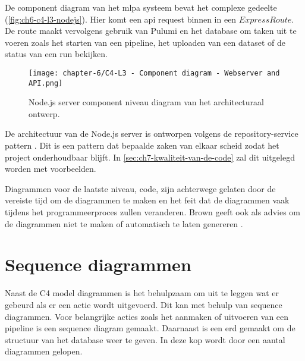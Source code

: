 De component diagram van het \acrshort{mlpa} systeem bevat het complexe gedeelte (\autoref{fig:ch6-c4-l3-nodejs}). Hier komt een \acrshort{api} request binnen in een \(Express Route\). De route maakt vervolgens gebruik van Pulumi en het database om taken uit te voeren zoals het starten van een pipeline, het uploaden van een dataset of de status van een run bekijken.

\begin{figure}[hbt!]
  \centering
  \texttt{[image: chapter-6/C4-L3 - Component diagram - Webserver and API.png]}
  \caption{Node.js server component niveau diagram van het architecturaal ontwerp.}
  \label{fig:ch6-c4-l3-nodejs}
\end{figure}


De architectuur van de Node.js server is ontworpen volgens de repository-service pattern \cite{repository-service-pattern}. Dit is een pattern dat bepaalde zaken van elkaar scheid zodat het project onderhoudbaar blijft. In \autoref{sec:ch7-kwaliteit-van-de-code} zal dit uitgelegd worden met voorbeelden.

Diagrammen voor de laatste niveau, code, zijn achterwege gelaten door de vereiste tijd om de diagrammen te maken en het feit dat de diagrammen vaak tijdens het programmeerproces zullen veranderen. Brown geeft ook als advies om de diagrammen niet te maken of automatisch te laten genereren \cite{c4-model-faq}.

\newpage

\section{Sequence diagrammen}\label{sec:ch6-sequence-diagrammen}
Naast de C4 model diagrammen is het behulpzaam om uit te leggen wat er gebeurd als er een actie wordt uitgevoerd. Dit kan met behulp van sequence diagrammen. Voor belangrijke acties zoals het aanmaken of uitvoeren van een pipeline is een sequence diagram gemaakt. Daarnaast is een \acrfull{erd} gemaakt om de structuur van het database weer te geven. In deze kop wordt door een aantal diagrammen gelopen.

